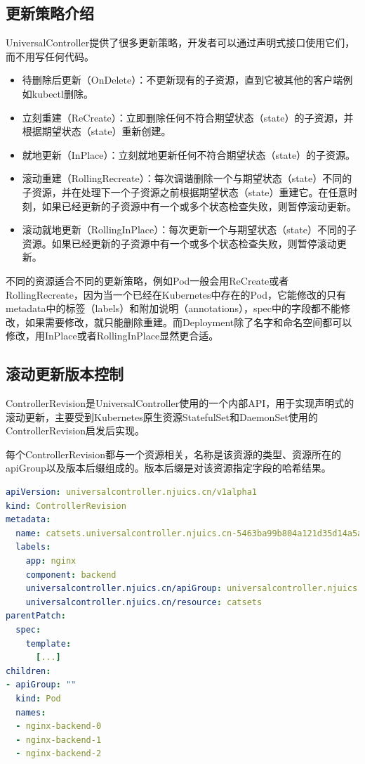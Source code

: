 \documentclass[macfonts,master]{njuthesis}
\begin{document}
\subsection{更新策略介绍}
UniversalController提供了很多更新策略，开发者可以通过声明式接口使用它们，而不用写任何代码。
\begin{itemize}
	\item 待删除后更新（OnDelete）：不更新现有的子资源，直到它被其他的客户端例如kubectl删除。
	\item 立刻重建（ReCreate）：立即删除任何不符合期望状态（state）的子资源，并根据期望状态（state）重新创建。
	\item 就地更新（InPlace）：立刻就地更新任何不符合期望状态（state）的子资源。
	\item 滚动重建（RollingRecreate）：每次调谐删除一个与期望状态（state）不同的子资源，并在处理下一个子资源之前根据期望状态（state）重建它。在任意时刻，如果已经更新的子资源中有一个或多个状态检查失败，则暂停滚动更新。
	\item 滚动就地更新（RollingInPlace）：每次更新一个与期望状态（state）不同的子资源。如果已经更新的子资源中有一个或多个状态检查失败，则暂停滚动更新。
\end{itemize}

不同的资源适合不同的更新策略，例如Pod一般会用ReCreate或者RollingRecreate，因为当一个已经在Kubernetes中存在的Pod，它能修改的只有metadata中的标签（labels）和附加说明（annotations），spec中的字段都不能修改，如果需要修改，就只能删除重建。而Deployment除了名字和命名空间都可以修改，用InPlace或者RollingInPlace显然更合适。

\subsection{滚动更新版本控制}\label{section:rolling-control}
ControllerRevision是UniversalController使用的一个内部API，用于实现声明式的滚动更新，主要受到Kubernetes原生资源StatefulSet和DaemonSet使用的ControllerRevision启发后实现。

每个ControllerRevision都与一个资源相关，名称是该资源的类型、资源所在的apiGroup以及版本后缀组成的。版本后缀是对该资源指定字段的哈希结果。

\begin{lstlisting}[language=yaml,caption=ControllerRevision示例,label=listing:controllerrevision]
apiVersion: universalcontroller.njuics.cn/v1alpha1
kind: ControllerRevision
metadata:
  name: catsets.universalcontroller.njuics.cn-5463ba99b804a121d35d14a5ab74546d1e8ba953
  labels:
    app: nginx
    component: backend
    universalcontroller.njuics.cn/apiGroup: universalcontroller.njuics.cn
    universalcontroller.njuics.cn/resource: catsets
parentPatch:
  spec:
    template:
      [...]
children:
- apiGroup: ""
  kind: Pod
  names:
  - nginx-backend-0
  - nginx-backend-1
  - nginx-backend-2
\end{lstlisting}
\end{document}
